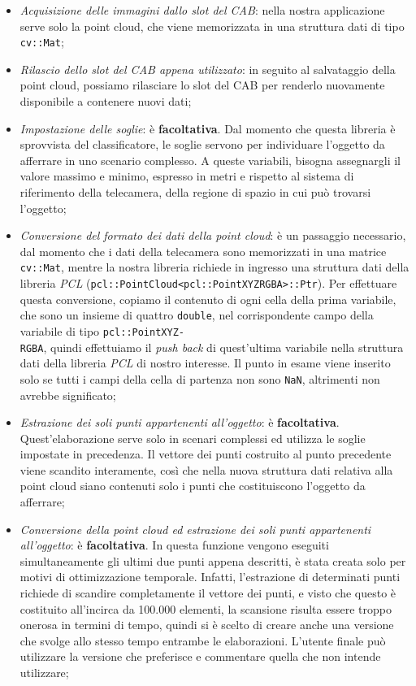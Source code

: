 \documentclass{report}
\begin{document}
\begin{itemize}
\item \textit{Acquisizione delle immagini dallo slot del CAB}: nella nostra applicazione serve solo la point cloud, che viene memorizzata in una struttura dati di tipo \texttt{cv::Mat};
\item \textit{Rilascio dello slot del CAB appena utilizzato}: in seguito al salvataggio della point cloud, possiamo rilasciare lo slot del CAB per renderlo nuovamente disponibile a contenere nuovi dati;
\item \textit{Impostazione delle soglie}: è \textbf{facoltativa}. Dal momento che questa libreria è sprovvista del classificatore, le soglie servono per individuare l'oggetto da afferrare in uno scenario complesso. A queste variabili, bisogna assegnargli il valore massimo e minimo, espresso in metri e rispetto al sistema di riferimento della telecamera, della regione di spazio in cui può trovarsi l'oggetto;
\item \textit{Conversione del formato dei dati della point cloud}: è un passaggio necessario, dal momento che i dati della telecamera sono memorizzati in una matrice \texttt{cv::Mat}, mentre la nostra libreria richiede in ingresso una struttura dati della libreria \textit{PCL} (\texttt{pcl::PointCloud<pcl::PointXYZRGBA>::Ptr}). Per effettuare questa conversione, copiamo il contenuto di ogni cella della prima variabile, che sono un insieme di quattro \texttt{double}, nel corrispondente campo della variabile di tipo \texttt{pcl::PointXYZ-}\\\texttt{RGBA}, quindi effettuiamo il \textit{push back} di quest'ultima variabile nella struttura dati della libreria \textit{PCL} di nostro interesse. Il punto in esame viene inserito solo se tutti i campi della cella di partenza non sono \texttt{NaN}, altrimenti non avrebbe significato;
\item \textit{Estrazione dei soli punti appartenenti all'oggetto}: è \textbf{facoltativa}. Quest'elaborazione serve solo in scenari complessi ed utilizza le soglie impostate in precedenza. Il vettore dei punti costruito al punto precedente viene scandito interamente, così che nella nuova struttura dati relativa alla point cloud siano contenuti solo i punti che costituiscono l'oggetto da afferrare;
\item \textit{Conversione della point cloud ed estrazione dei soli punti appartenenti all'oggetto}: è \textbf{facoltativa}. In questa funzione vengono eseguiti simultaneamente gli ultimi due punti appena descritti, è stata creata solo per motivi di ottimizzazione temporale. Infatti, l'estrazione di determinati punti richiede di scandire completamente il vettore dei punti, e visto che questo è costituito all'incirca da 100.000 elementi, la scansione risulta essere troppo onerosa in termini di tempo, quindi si è scelto di creare anche una versione che svolge allo stesso tempo entrambe le elaborazioni. L'utente finale può utilizzare la versione che preferisce e commentare quella che non intende utilizzare;

\end{itemize}
\end{document}

